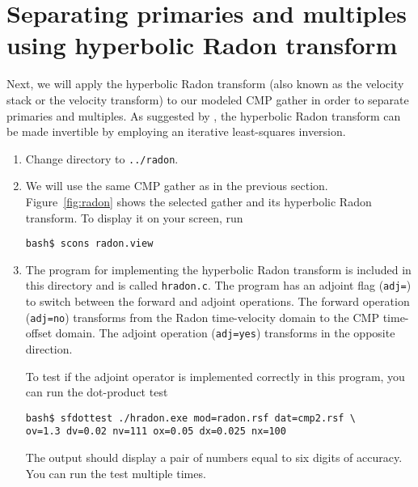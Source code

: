 \lstset{language=python,numbers=left,numberstyle=\tiny,showstringspaces=false}


\section{Separating primaries and multiples using hyperbolic Radon transform}

Next, we will apply the hyperbolic Radon transform (also known as the velocity stack or the velocity transform) to our modeled CMP gather in order to separate primaries and multiples. As suggested by \cite{GEO50-12-27272741}, the hyperbolic Radon transform can be made invertible by employing an iterative least-squares inversion.

\begin{enumerate}

\item Change directory to \texttt{../radon}.


\item We will use the same CMP gather as in the previous section. Figure~\ref{fig:radon} shows the selected gather and its hyperbolic Radon transform. To display it on your screen, run
\begin{verbatim}
bash$ scons radon.view
\end{verbatim}

\item The program for implementing the hyperbolic Radon transform is included in this directory and is called \texttt{hradon.c}. The program has an adjoint flag (\texttt{adj=}) to switch between the forward and adjoint operations. The forward operation (\texttt{adj=no}) transforms from the Radon time-velocity domain to the CMP time-offset domain. The adjoint operation  (\texttt{adj=yes}) transforms in the opposite direction. 

To test if the adjoint operator is implemented correctly in this program, you can run the dot-product test
\begin{verbatim}
bash$ sfdottest ./hradon.exe mod=radon.rsf dat=cmp2.rsf \
ov=1.3 dv=0.02 nv=111 ox=0.05 dx=0.025 nx=100
\end{verbatim}
The output should display a pair of numbers equal to six digits of accuracy. You can run the test multiple times.


\end{enumerate}
